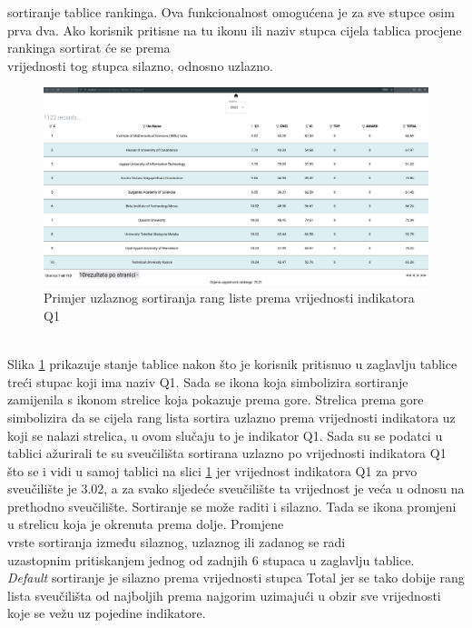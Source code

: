 \documentclass[times, utf8, zavrsni]{fer}
\begin{document}
sortiranje tablice rankinga. Ova funkcionalnost omogućena je za sve stupce osim prva dva. Ako korisnik pritisne na tu ikonu ili naziv stupca cijela tablica 
procjene rankinga sortirat će se prema \\vrijednosti tog stupca silazno, odnosno uzlazno. 
\begin{figure}[htb]
    \hspace*{-2cm}  
       \includegraphics[scale=0.21]{sort1.png} 
       \caption{Primjer uzlaznog sortiranja rang liste prema vrijednosti indikatora Q1}
       \label{fig:sort1}
       \end{figure}
\\Slika \ref{fig:sort1} prikazuje stanje tablice nakon što je korisnik pritisnuo u zaglavlju tablice treći stupac koji ima naziv Q1. Sada se ikona koja simbolizira
sortiranje zamijenila s ikonom strelice koja pokazuje prema gore. Strelica prema gore simbolizira da se cijela rang lista
sortira uzlazno prema vrijednosti indikatora uz koji se nalazi strelica, u ovom slučaju to je indikator Q1. Sada su se podatci u tablici 
ažurirali te su sveučilišta sortirana uzlazno po vrijednosti indikatora Q1 što se i vidi u samoj tablici na slici \ref{fig:sort1} jer vrijednost indikatora Q1 za prvo 
sveučilište je 3.02, a za svako sljedeće sveučilište ta vrijednost je veća u odnosu na prethodno sveučilište. Sortiranje se može raditi i silazno. Tada se ikona promjeni
u strelicu koja je okrenuta prema dolje. Promjene \\vrste sortiranja između silaznog, uzlaznog ili zadanog  se radi \\uzastopnim pritiskanjem 
jednog od zadnjih 6 stupaca u zaglavlju tablice.
\\\emph{Default} sortiranje je silazno prema vrijednosti stupca Total jer se tako dobije rang lista sveučilišta od najboljih prema najgorim uzimajući u obzir sve 
vrijednosti koje se vežu uz pojedine indikatore.
\end{document}
